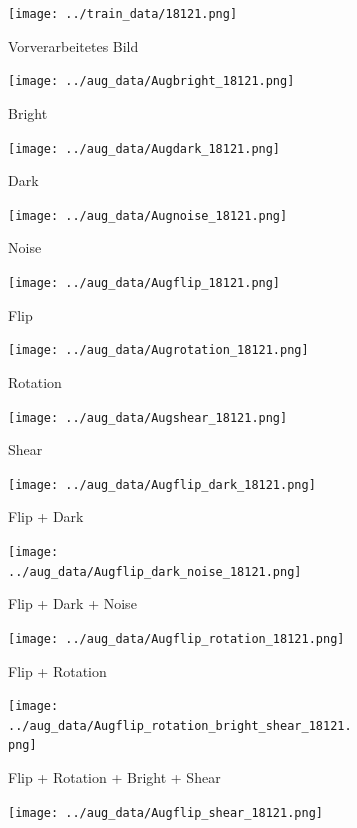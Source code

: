 \begin{figure}[H]
	\centering
	\begin{subfigure}[t]{0.2\textwidth}
		\texttt{[image: ../train\_data/18121.png]}
		\caption{Vorverarbeitetes Bild}
	\end{subfigure} \hfill
	\begin{subfigure}[t]{0.2\textwidth}
		\texttt{[image: ../aug\_data/Augbright\_18121.png]}
		\caption{Bright}
	\end{subfigure} \hfill
	\begin{subfigure}[t]{0.2\textwidth}
		\texttt{[image: ../aug\_data/Augdark\_18121.png]}
		\caption{Dark}
	\end{subfigure} \hfill
	\begin{subfigure}[t]{0.2\textwidth}
		\texttt{[image: ../aug\_data/Augnoise\_18121.png]}
		\caption{Noise}
	\end{subfigure} \hfill
	\begin{subfigure}[t]{0.2\textwidth}
		\texttt{[image: ../aug\_data/Augflip\_18121.png]}
		\caption{Flip}
	\end{subfigure} \hfill
	\begin{subfigure}[t]{0.2\textwidth}
		\texttt{[image: ../aug\_data/Augrotation\_18121.png]}
		\caption{Rotation}
	\end{subfigure} \hfill
	\begin{subfigure}[t]{0.2\textwidth}
		\texttt{[image: ../aug\_data/Augshear\_18121.png]}
		\caption{Shear}
	\end{subfigure} \hfill
	\begin{subfigure}[t]{0.2\textwidth}
		\texttt{[image: ../aug\_data/Augflip\_dark\_18121.png]}
		\caption{Flip + Dark}
	\end{subfigure} \hfill
	\begin{subfigure}[t]{0.2\textwidth}
		\texttt{[image: ../aug\_data/Augflip\_dark\_noise\_18121.png]}
		\caption{Flip + Dark + Noise}
	\end{subfigure} \hfill
	\begin{subfigure}[t]{0.2\textwidth}
		\texttt{[image: ../aug\_data/Augflip\_rotation\_18121.png]}
		\caption{Flip + Rotation}
	\end{subfigure} \hfill
	\begin{subfigure}[t]{0.2\textwidth}
		\texttt{[image: ../aug\_data/Augflip\_rotation\_bright\_shear\_18121.png]}
		\caption{Flip + Rotation + Bright + Shear}
	\end{subfigure} \hfill
	\begin{subfigure}[t]{0.2\textwidth}
		\texttt{[image: ../aug\_data/Augflip\_shear\_18121.png]}

\end{subfigure}
\end{figure}
